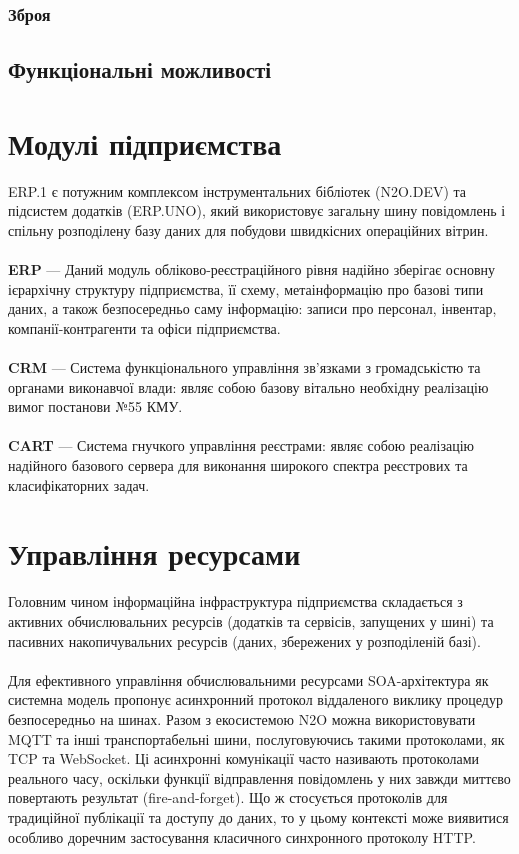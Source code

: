 \subsubsection{Зброя}

\subsection{Функціональні можливості}

\newpage
\section{Модулі підприємства}

ERP.1 є потужним комплексом інструментальних бібліотек (N2O.DEV) та підсистем додатків (ERP.UNO), який використовує загальну шину повідомлень і спільну розподілену базу даних для побудови швидкісних операційних вітрин.
\\
\\
\textbf{ERP} — Даний модуль обліково-реєстраційного рівня надійно зберігає основну ієрархічну структуру підприємства, її схему, метаінформацію про базові типи даних, а також безпосередньо саму інформацію: записи про персонал, інвентар, компанії-контрагенти та офіси підприємства.
\\
\\
\textbf{CRM} — Система функціонального управління зв'язками з громадськістю та органами виконавчої влади: являє собою базову вітально необхідну реалізацію вимог постанови №55 КМУ.
\\
\\
\textbf{CART} — Система гнучкого управління реєстрами: являє собою реалізацію надійного базового сервера для виконання широкого спектра реєстрових та класифікаторних задач.

\newpage
\section{Управління ресурсами}

Головним чином інформаційна інфраструктура підприємства складається з активних обчислювальних ресурсів (додатків та сервісів, запущених у шині) та пасивних накопичувальних ресурсів (даних, збережених у розподіленій базі).
\\
\\
Для ефективного управління обчислювальними ресурсами SOA-архітектура як системна модель пропонує асинхронний протокол віддаленого виклику процедур безпосередньо на шинах. Разом з екосистемою N2O можна використовувати MQTT та інші транспортабельні шини, послуговуючись такими протоколами, як TCP та WebSocket. Ці асинхронні комунікації часто називають протоколами реального часу, оскільки функції відправлення повідомлень у них завжди миттєво повертають результат (fire-and-forget). Що ж стосується протоколів для традиційної публікації та доступу до даних, то у цьому контексті може виявитися особливо доречним застосування класичного синхронного протоколу HTTP.


